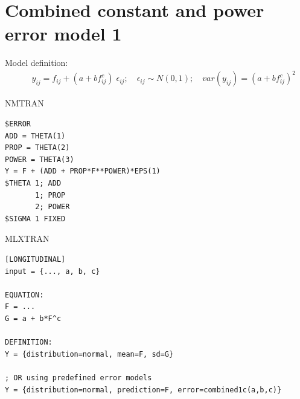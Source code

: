 \section{Combined constant and power error model 1}
\label{model6}
Model definition:
\begin{eqnarray}
&& y_{ij} =  f_{ij} + (a + b f_{ij}^c) \; \epsilon_{ij}; \quad \epsilon_{ij} \sim N(0,1); \quad \mathit{var}(y_{ij}) = (a + bf_{ij}^c)^2 \nonumber
\end{eqnarray}

\bigskip
\begin{lrbox}{\lstbox}\begin{minipage}{16cm}
NMTRAN
\begin{lstlisting}[frame=single,language=NM]
$ERROR
ADD = THETA(1)
PROP = THETA(2)
POWER = THETA(3)
Y = F + (ADD + PROP*F**POWER)*EPS(1)
$THETA 1; ADD
	   1; PROP
	   2; POWER
$SIGMA 1 FIXED
\end{lstlisting}   
\end{minipage}\end{lrbox}
\usebox\lstbox


\begin{lrbox}{\lstbox}\begin{minipage}{16cm}
MLXTRAN
\begin{lstlisting}[frame=single,language=MLX]
[LONGITUDINAL]
input = {..., a, b, c}

EQUATION:
F = ...
G = a + b*F^c

DEFINITION:
Y = {distribution=normal, mean=F, sd=G}

; OR using predefined error models
Y = {distribution=normal, prediction=F, error=combined1c(a,b,c)}
\end{lstlisting}   
\end{minipage}\end{lrbox}
\usebox\lstbox


